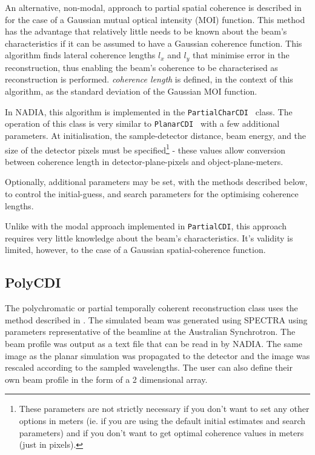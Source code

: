 \documentclass[]{nadia}
\def\name{NADIA}
\begin{document}
An alternative, non-modal, approach to partial spatial coherence is described in \cite{gaussianCharacterisation} for the case of a Gaussian mutual optical intensity (MOI) function. This method has the advantage that relatively little needs to be known about the beam's characteristics if it can be assumed to have a Gaussian coherence function. This algorithm finds lateral coherence lengths $l_x$ and $l_y$ that minimise error in the reconstruction, thus enabling the beam's coherence to be characterised as reconstruction is performed. {\em coherence length} is defined, in the context of this algorithm, as the standard deviation of the Gaussian MOI function.

In \name, this algorithm is implemented in the {\tt PartialCharCDI } class. The operation of this class is very similar to { \tt PlanarCDI } with a few additional parameters. At initialisation, the sample-detector distance, beam energy, and the size of the detector pixels must be specified\footnote{These parameters are not strictly necessary if you don't want to set any other options in meters (ie. if you are using the default initial estimates and search parameters) and if you don't want to get optimal coherence values in meters (just in pixels).} - these values allow conversion between coherence length in detector-plane-pixels and object-plane-meters.

Optionally, additional parameters may be set, with the methods described below, to control the initial-guess, and search parameters for the optimising coherence lengths.

Unlike with the modal approach implemented in {\tt PartialCDI}, this approach requires very little knowledge about the beam's characteristics. It's validity is limited, however, to the case of a Gaussian spatial-coherence function.\\

\subsection{PolyCDI}


The polychromatic or partial temporally coherent reconstruction  class uses the method described in \cite{6198103420110701}. The simulated beam was generated using SPECTRA \cite{spectra} using parameters
representative of the beamline at the Australian Synchrotron. The beam profile was output as a text file that 
can be read in by \name. The same image as the planar simulation was propagated to the detector and the image was rescaled according to the sampled wavelengths. The user can also define their own beam profile in the form of a 2 dimensional array.\\
\end{document}
